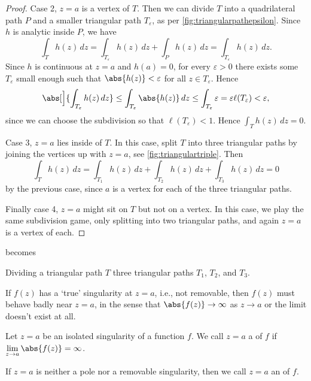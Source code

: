 \begin{proof}
	Case 2, $z = a$ is a vertex of $T$.
	Then we can divide $T$ into a quadrilateral path $P$ and a smaller triangular path $T_\varepsilon$, as per \autoref{fig:triangularpathepsilon}.
	Since $h$ is analytic inside $P$, we have
	\[
		\int_T h(z) \, d z = \int_{T_\varepsilon} h(z) \, d z + \int_P h(z) \, d z = \int_{T_\varepsilon} h(z) \, d z.
	\]
	Since $h$ is continuous at $z = a$ and $h(a) = 0$, for every $\varepsilon > 0$ there exists some $T_\varepsilon$ small enough such that $\abs{h(z)} < \varepsilon$ for all $z \in T_\varepsilon$.
	Hence
	\[
		\abs[\Big]{\int_{T_\varepsilon} h(z) \, d z} \leq \int_{T_\varepsilon} \abs{h(z)} \, d z \leq \int_{T_\varepsilon} \varepsilon = \varepsilon \ell(T_\varepsilon) < \varepsilon,
	\]
	since we can choose the subdivision so that $\ell(T_\varepsilon) < 1$.
	Hence $\int_T h(z) \, d z = 0$.

	Case 3, $z = a$ lies inside of $T$. In this case, split $T$ into three triangular paths by joining the vertices up with $z = a$, see \autoref{fig:triangulartriple}.
	Then
	\[
		\int_T h(z) \, d z = \int_{T_1} h(z) \, d z + \int_{T_2} h(z) \, d z + \int_{T_3} h(z) \, d z = 0
	\]
	by the previous case, since $a$ is a vertex for each of the three triangular paths.

	Finally case 4, $z = a$ might sit on $T$ but not on a vertex.
	In this case, we play the same subdivision game, only splitting into two triangular paths, and again $z = a$ is a vertex of each.
\end{proof}

\begin{marginfigure}
	\centering

	becomes


	\caption{\label{fig:triangulartriple} Dividing a triangular path $T$ three triangular paths $T_1$, $T_2$, and $T_3$.}
\end{marginfigure}

\begin{remark}
	If $f(z)$ has a `true' singularity at $z = a$, i.e., not removable, then $f(z)$ must behave badly near $z = a$, in the sense that $\abs{f(z)} \to \infty$ as $z \to a$ or the limit doesn't exist at all.
\end{remark}

\begin{definition}
	Let $z = a$ be an isolated singularity of a function $f$.
	We call $z = a$ a  of $f$ if $\lim\limits_{z \to a} \abs{f(z)} = \infty$.

	If $z = a$ is neither a pole nor a removable singularity, then we call $z = a$ an  of $f$.
\end{definition}

